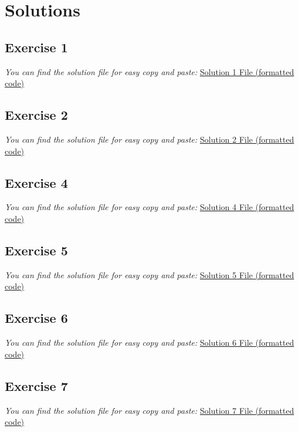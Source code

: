 \section{Solutions}

\subsection{Exercise 1}
\textit{You can find the solution file for easy copy and paste:} \href{https://github.com/elRaulito/eUTxO-Fundamentals-Building-Cardano-Smart-Contracts/blob/main/eBook/sections/solutions/index.html}{Solution 1 File (formatted code)}


\subsection{Exercise 2}
\textit{You can find the solution file for easy copy and paste:} \href{https://github.com/elRaulito/eUTxO-Fundamentals-Building-Cardano-Smart-Contracts/blob/main/eBook/sections/solutions/get_addresses.py}{Solution 2 File (formatted code)}


\subsection{Exercise 4}
\textit{You can find the solution file for easy copy and paste:} \href{https://github.com/elRaulito/eUTxO-Fundamentals-Building-Cardano-Smart-Contracts/blob/main/eBook/sections/solutions/nft.ak}{Solution 4 File (formatted code)}


\subsection{Exercise 5}
\textit{You can find the solution file for easy copy and paste:} \href{https://github.com/elRaulito/eUTxO-Fundamentals-Building-Cardano-Smart-Contracts/blob/main/eBook/sections/solutions/cip69.ak}{Solution 5 File (formatted code)}


\subsection{Exercise 6}
\textit{You can find the solution file for easy copy and paste:} \href{https://github.com/elRaulito/eUTxO-Fundamentals-Building-Cardano-Smart-Contracts/blob/main/eBook/sections/solutions/fraction.ak}{Solution 6 File (formatted code)}


\subsection{Exercise 7}
\textit{You can find the solution file for easy copy and paste:} \href{https://github.com/elRaulito/eUTxO-Fundamentals-Building-Cardano-Smart-Contracts/blob/main/eBook/sections/solutions/delist.js}{Solution 7 File (formatted code)}

